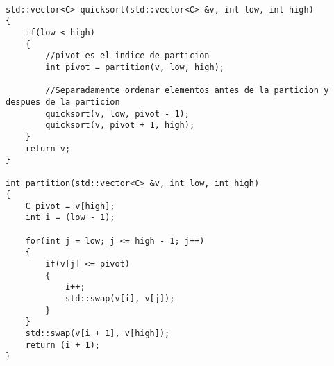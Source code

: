 \begin{lstlisting}

std::vector<C> quicksort(std::vector<C> &v, int low, int high)
{
    if(low < high)
    {
        //pivot es el indice de particion
        int pivot = partition(v, low, high);

        //Separadamente ordenar elementos antes de la particion y despues de la particion
        quicksort(v, low, pivot - 1);
        quicksort(v, pivot + 1, high);
    }
    return v;
}

int partition(std::vector<C> &v, int low, int high)
{
    C pivot = v[high];
    int i = (low - 1);

    for(int j = low; j <= high - 1; j++)
    {
        if(v[j] <= pivot)
        {
            i++;
            std::swap(v[i], v[j]);
        }
    }
    std::swap(v[i + 1], v[high]);
    return (i + 1);
}


\end{lstlisting}